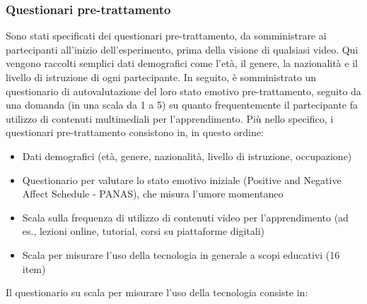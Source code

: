 \subsubsection{Questionari pre-trattamento}

Sono stati specificati dei questionari pre-trattamento, da somministrare ai partecipanti all'inizio dell'esperimento, prima della visione di qualsiasi video. Qui vengono raccolti semplici dati demografici come l'età, il genere, la nazionalità e il livello di istruzione di ogni partecipante. In seguito, è somministrato un questionario di autovalutazione del loro stato emotivo pre-trattamento, seguito da una domanda (in una scala da 1 a 5) su quanto frequentemente il partecipante fa utilizzo di contenuti multimediali per l'apprendimento. Più nello specifico, i questionari pre-trattamento consistono in, in questo ordine:

\begin{itemize}
    \item  Dati demografici (età, genere, nazionalità, livello di istruzione, occupazione)\
    \item Questionario per valutare lo stato emotivo iniziale (Positive and Negative Affect Schedule - PANAS), che misura l’umore momentaneo
    \item Scala sulla frequenza di utilizzo di contenuti video per l'apprendimento (ad es., lezioni online, tutorial, corsi su piattaforme digitali)
    \item Scala per misurare l'uso della tecnologia in generale a scopi educativi (16 item)
\end{itemize}

Il questionario su scala per misurare l'uso della tecnologia consiste in:

